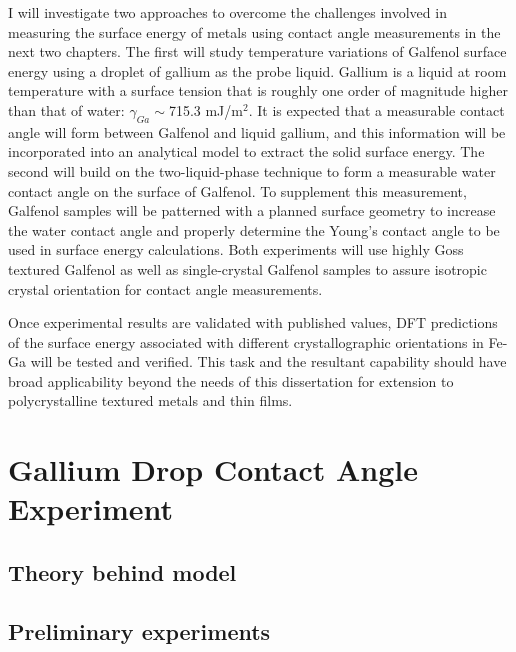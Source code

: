 \documentclass[12pt,letterpaper]{report}
\begin{document}
I will investigate two approaches to overcome the challenges involved in measuring the surface energy of metals using contact angle measurements in the next two chapters. The first will study temperature variations of Galfenol surface energy using a droplet of gallium as the probe liquid. Gallium is a liquid at room temperature with a surface tension that is roughly one order of magnitude higher than that of water: $\gamma_{Ga}\sim$715.3 mJ/m$^2$. It is expected that a measurable contact angle will form between Galfenol and liquid gallium, and this information will be incorporated into an analytical model to extract the solid surface energy. The second will build on the two-liquid-phase technique to form a measurable water contact angle on the surface of Galfenol. To supplement this measurement, Galfenol samples will be patterned with a planned surface geometry to increase the water contact angle and properly determine the Young's contact angle to be used in surface energy calculations. Both experiments will use highly Goss textured Galfenol as well as single-crystal Galfenol samples to assure isotropic crystal orientation for contact angle measurements. 

Once experimental results are validated with published values, DFT predictions of the surface energy associated with different crystallographic orientations in Fe-Ga will be tested and verified. This task and the resultant capability should have broad applicability beyond the needs of this dissertation for extension to polycrystalline textured metals and thin films.
%


\newpage
\chapter{Gallium Drop Contact Angle Experiment}\label{chapter2}



\section{Theory behind model}\label{section2-1}


\section{Preliminary experiments}\label{section2-2}

\end{document}
